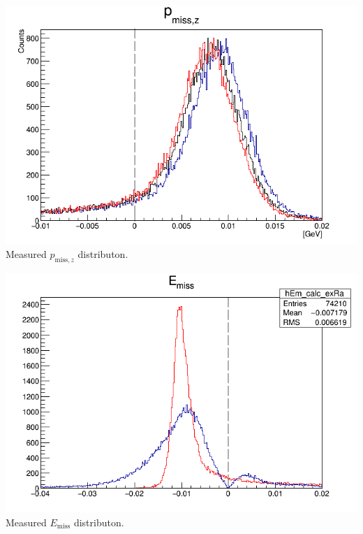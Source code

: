 \documentclass{article}
\begin{document}
\begin{center}
\includegraphics[width=14cm]{Pmz.png}\\
Measured $p_{\textrm{miss},z}$ distributon.
\end{center}

\begin{center}
\includegraphics[width=14cm]{Em.png}\\
Measured $E_{\textrm{miss}}$ distributon.
\end{center}

\clearpage


\end{document}
